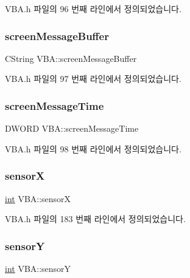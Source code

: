 V\+B\+A.\+h 파일의 96 번째 라인에서 정의되었습니다.

\mbox{\label{class_v_b_a_ab9551bfe042a30531aeb47a7b2ac2038}} 
\subsubsection{\texorpdfstring{screen\+Message\+Buffer}{screenMessageBuffer}}
{\footnotesize\ttfamily C\+String V\+B\+A\+::screen\+Message\+Buffer}



V\+B\+A.\+h 파일의 97 번째 라인에서 정의되었습니다.

\mbox{\label{class_v_b_a_a27f8c0f4add5a8242470289874dd601c}} 
\subsubsection{\texorpdfstring{screen\+Message\+Time}{screenMessageTime}}
{\footnotesize\ttfamily D\+W\+O\+RD V\+B\+A\+::screen\+Message\+Time}



V\+B\+A.\+h 파일의 98 번째 라인에서 정의되었습니다.

\mbox{\label{class_v_b_a_a070ab23839c3e1b67c29c70a34c87b1a}} 
\subsubsection{\texorpdfstring{sensorX}{sensorX}}
{\footnotesize\ttfamily \mbox{\hyperlink{_util_8cpp_a0ef32aa8672df19503a49fab2d0c8071}{int}} V\+B\+A\+::sensorX}



V\+B\+A.\+h 파일의 183 번째 라인에서 정의되었습니다.

\mbox{\label{class_v_b_a_a090bef0a0f7702b275e46ee14a130359}} 
\subsubsection{\texorpdfstring{sensorY}{sensorY}}
{\footnotesize\ttfamily \mbox{\hyperlink{_util_8cpp_a0ef32aa8672df19503a49fab2d0c8071}{int}} V\+B\+A\+::sensorY}



